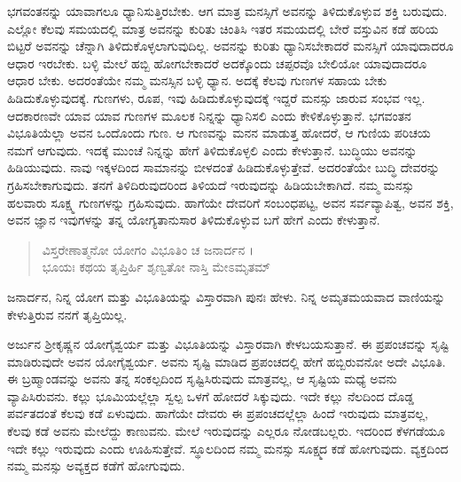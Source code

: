 ಭಗವಂತನನ್ನು ಯಾವಾಗಲೂ ಧ್ಯಾನಿಸುತ್ತಿರಬೇಕು. ಆಗ ಮಾತ್ರ ಮನಸ್ಸಿಗೆ ಅವನನ್ನು ತಿಳಿದುಕೊಳ್ಳುವ ಶಕ್ತಿ ಬರುವುದು. ಎಲ್ಲೋ ಕೆಲವು ಸಮಯದಲ್ಲಿ ಮಾತ್ರ ಅವನನ್ನು ಕುರಿತು ಚಿಂತಿಸಿ ಇತರ ಸಮಯದಲ್ಲಿ ಬೇರೆ ವಸ್ತುವಿನ ಕಡೆ ಹರಿಯ ಬಿಟ್ಟರೆ ಅವನನ್ನು ಚೆನ್ನಾಗಿ ತಿಳಿದುಕೊಳ್ಳಲಾಗುವುದಿಲ್ಲ. ಅವನನ್ನು ಕುರಿತು ಧ್ಯಾನಿಸಬೇಕಾದರೆ ಮನಸ್ಸಿಗೆ ಯಾವುದಾದರೂ ಆಧಾರ ಇರಬೇಕು. ಬಳ್ಳಿ ಮೇಲೆ ಹಬ್ಬಿ ಹೋಗಬೇಕಾದರೆ ಅದಕ್ಕೊಂದು ಚಪ್ಪರವೊ ಬೇಲಿಯೋ ಯಾವುದಾದರೂ ಆಧಾರ ಬೇಕು. ಅದರಂತೆಯೇ ನಮ್ಮ ಮನಸ್ಸಿನ ಬಳ್ಳಿ ಧ್ಯಾನ. ಅದಕ್ಕೆ ಕೆಲವು ಗುಣಗಳ ಸಹಾಯ ಬೇಕು ಹಿಡಿದುಕೊಳ್ಳುವುದಕ್ಕೆ. ಗುಣಗಳು, ರೂಪ, ಇವು ಹಿಡಿದುಕೊಳ್ಳುವುದಕ್ಕೆ ಇದ್ದರೆ ಮನಸ್ಸು ಜಾರುವ ಸಂಭವ ಇಲ್ಲ. ಆದಕಾರಣವೇ ಯಾವ ಯಾವ ಗುಣಗಳ ಮೂಲಕ ನಿನ್ನನ್ನು ಧ್ಯಾನಿಸಲಿ ಎಂದು ಕೇಳಿಕೊಳ್ಳುತ್ತಾನೆ. ಭಗವಂತನ ವಿಭೂತಿಯೆಲ್ಲಾ ಅವನ ಒಂದೊಂದು ಗುಣ. ಆ ಗುಣವನ್ನು ಮನನ ಮಾಡುತ್ತ ಹೋದರೆ, ಆ ಗುಣಿಯ ಪರಿಚಯ ನಮಗೆ ಆಗುವುದು. ಇದಕ್ಕೆ ಮುಂಚೆ ನಿನ್ನನ್ನು ಹೇಗೆ ತಿಳಿದುಕೊಳ್ಳಲಿ ಎಂದು ಕೇಳುತ್ತಾನೆ. ಬುದ್ಧಿಯು ಅವನನ್ನು ಹಿಡಿಯುವುದು. ನಾವು ಇಕ್ಕಳದಿಂದ ಸಾಮಾನನ್ನು ಬೀಳದಂತೆ ಹಿಡಿದುಕೊಳ್ಳುತ್ತೇವೆ. ಅದರಂತೆಯೇ ಬುದ್ಧಿ ದೇವರನ್ನು ಗ್ರಹಿಸಬೇಕಾಗುವುದು. ತನಗೆ ತಿಳಿದಿರುವುದರಿಂದ ತಿಳಿಯದೆ ಇರುವುದನ್ನು ಹಿಡಿಯಬೇಕಾಗಿದೆ. ನಮ್ಮ ಮನಸ್ಸು ಹಲವಾರು ಸೂಕ್ಷ್ಮ ಗುಣಗಳನ್ನು ಗ್ರಹಿಸುವುದು. ಹಾಗೆಯೇ ದೇವರಿಗೆ ಸಂಬಂಧಪಟ್ಟ, ಅವನ ಸರ್ವವ್ಯಾಪಿತ್ವ, ಅವನ ಶಕ್ತಿ, ಅವನ ಜ್ಞಾನ ಇವುಗಳನ್ನು ತನ್ನ ಯೋಗ್ಯತಾನುಸಾರ ತಿಳಿದುಕೊಳ್ಳುವ ಬಗೆ ಹೇಗೆ ಎಂದು ಕೇಳುತ್ತಾನೆ.

\begin{verse}
ವಿಸ್ತರೇಣಾತ್ಮನೋ ಯೋಗಂ ವಿಭೂತಿಂ ಚ ಜನಾರ್ದನ ।\\ಭೂಯಃ ಕಥಯ ತೃಪ್ತಿರ್ಹಿ ಶೃಣ್ವತೋ ನಾಸ್ತಿ ಮೇಽಮೃತಮ್ 
\end{verse}

{\small ಜನಾರ್ದನ, ನಿನ್ನ ಯೋಗ ಮತ್ತು ವಿಭೂತಿಯನ್ನು ವಿಸ್ತಾರವಾಗಿ ಪುನಃ ಹೇಳು. ನಿನ್ನ ಅಮೃತಮಯವಾದ ವಾಣಿಯನ್ನು ಕೇಳುತ್ತಿರುವ ನನಗೆ ತೃಪ್ತಿಯಿಲ್ಲ.}

ಅರ್ಜುನ ಶ್ರೀಕೃಷ್ಣನ ಯೋಗೈಶ್ವರ್ಯ ಮತ್ತು ವಿಭೂತಿಯನ್ನು ವಿಸ್ತಾರವಾಗಿ ಕೇಳಬಯಸುತ್ತಾನೆ. ಈ ಪ್ರಪಂಚವನ್ನು ಸೃಷ್ಟಿ ಮಾಡಿರುವುದೇ ಅವನ ಯೋಗೈಶ್ವರ್ಯ. ಅವನು ಸೃಷ್ಟಿ ಮಾಡಿದ ಪ್ರಪಂಚದಲ್ಲಿ ಹೇಗೆ ಹಬ್ಬಿರುವನೋ ಅದೇ ವಿಭೂತಿ. ಈ ಬ್ರಹ್ಮಾಂಡವನ್ನು ಅವನು ತನ್ನ ಸಂಕಲ್ಪದಿಂದ ಸೃಷ್ಟಿಸಿರುವುದು ಮಾತ್ರವಲ್ಲ, ಆ ಸೃಷ್ಟಿಯ ಮಧ್ಯೆ ಅವನು ವ್ಯಾಪಿಸಿರುವನು. ಕಲ್ಲು ಭೂಮಿಯಲ್ಲೆಲ್ಲಾ ಸ್ವಲ್ಪ ಒಳಗೆ ಹೋದರೆ ಸಿಕ್ಕುವುದು. ಇದೇ ಕಲ್ಲು ನೆಲದಿಂದ ದೊಡ್ಡ ಪರ್ವತದಂತೆ ಕೆಲವು ಕಡೆ ಏಳುವುದು. ಹಾಗೆಯೇ ದೇವರು ಈ ಪ್ರಪಂಚದಲ್ಲೆಲ್ಲಾ ಹಿಂದೆ ಇರುವುದು ಮಾತ್ರವಲ್ಲ, ಕೆಲವು ಕಡೆ ಅವನು ಮೇಲೆದ್ದು ಕಾಣುವನು. ಮೇಲೆ ಇರುವುದನ್ನು ಎಲ್ಲರೂ ನೋಡಬಲ್ಲರು. ಇದರಿಂದ ಕೆಳಗಡೆಯೂ ಇದೇ ಕಲ್ಲು ಇರುವುದು ಎಂದು ಊಹಿಸುತ್ತೇವೆ. ಸ್ಥೂಲದಿಂದ ನಮ್ಮ ಮನಸ್ಸು ಸೂಕ್ಷ್ಮದ ಕಡೆ ಹೋಗುವುದು. ವ್ಯಕ್ತದಿಂದ ನಮ್ಮ ಮನಸ್ಸು ಅವ್ಯಕ್ತದ ಕಡೆಗೆ ಹೋಗುವುದು.

